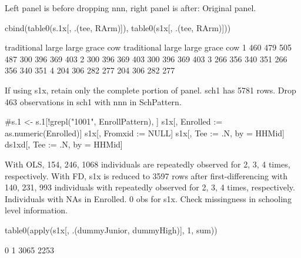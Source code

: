Left panel is before dropping \textsf{nnn}, right panel is after: Original panel.
\begin{Schunk}
\begin{Sinput}
cbind(table0(s.1x[, .(tee, RArm)]), 
  table0(s1x[, .(tee, RArm)]))
\end{Sinput}
\begin{Soutput}
  traditional large large grace cow traditional large large grace cow
1         460   479         505 487         300   396         369 403
2         300   396         369 403         300   396         369 403
3         266   356         340 351         266   356         340 351
4         204   306         282 277         204   306         282 277
\end{Soutput}
\end{Schunk}
If using \textsf{s1x}, retain only the complete portion of panel. \textsf{sch1} has 5781 rows. Drop 463 observations in \textsf{sch1} with nnn in \textsf{SchPattern}. 
\begin{Schunk}
\begin{Sinput}
#s.1 <- s.1[!grepl("1001", EnrollPattern), ]
s1x[, Enrolled := as.numeric(Enrolled)]
s1x[, Fromxid := NULL]
s1x[, Tee := .N, by = HHMid]
ds1xd[, Tee := .N, by = HHMid]
\end{Sinput}
\end{Schunk}
With OLS,  154, 246, 1068 individuals are repeatedly observed for 2, 3, 4 times, respectively. With FD, \textsf{s1x} is reduced to 3597 rows after first-differencing with 140, 231, 993 individuals with repeatedly observed for 2, 3, 4 times, respectively.
Individuals with NAs in \textsf{Enrolled}. 0 obs for \textsf{s1x}. 
Check missingness in schooling level information.
\begin{Schunk}
\begin{Sinput}
table0(apply(s1x[, .(dummyJunior, dummyHigh)], 1, sum))
\end{Sinput}
\begin{Soutput}

   0    1 
3065 2253 
\end{Soutput}
\end{Schunk}
